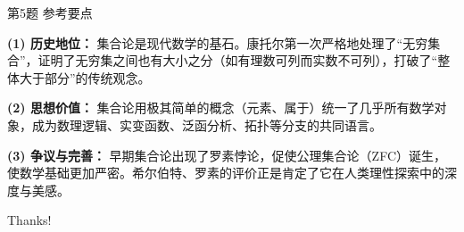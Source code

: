 \documentclass[10pt,aspectratio=169,serif]{beamer}
\begin{document}
\begin{frame}[t]{第5题 参考要点}
\begin{tcolorbox}[colback=orange!10,colframe=orange,title=\textbf{参考报告要点}]
\textbf{(1) 历史地位：} 集合论是现代数学的基石。康托尔第一次严格地处理了“无穷集合”，证明了无穷集之间也有大小之分（如有理数可列而实数不可列），打破了“整体大于部分”的传统观念。

\vspace{0.5em}
\textbf{(2) 思想价值：} 集合论用极其简单的概念（元素、属于）统一了几乎所有数学对象，成为数理逻辑、实变函数、泛函分析、拓扑等分支的共同语言。

\vspace{0.5em}
\textbf{(3) 争议与完善：} 早期集合论出现了罗素悖论，促使公理集合论（ZFC）诞生，使数学基础更加严密。希尔伯特、罗素的评价正是肯定了它在人类理性探索中的深度与美感。
\end{tcolorbox}
\end{frame}

\begin{frame}[c]
  \begin{center}
    {\Huge\calligra Thanks!}
  \end{center}
\end{frame}
\end{document}
